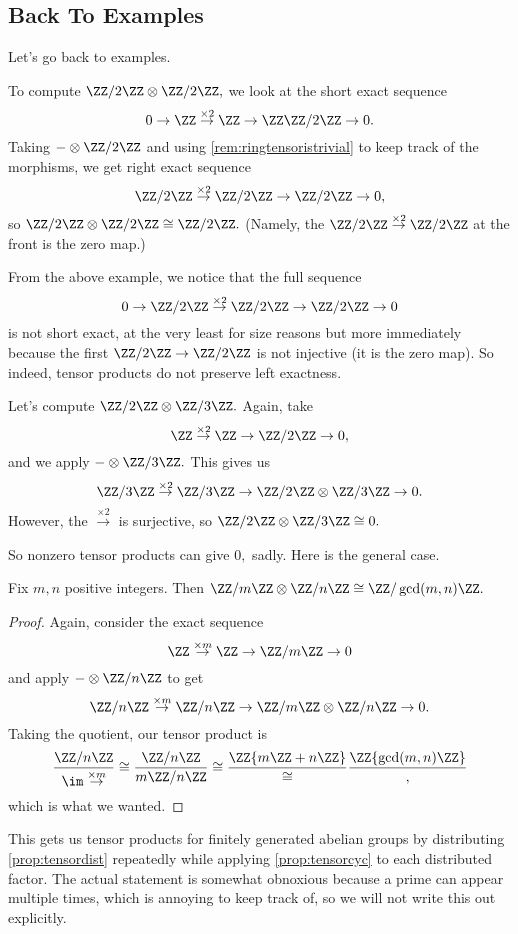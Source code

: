 \subsection{Back To Examples}
Let's go back to examples.
\begin{example}
	To compute $\ZZ/2\ZZ\otimes\ZZ/2\ZZ,$ we look at the short exact sequence
	\[0\to\ZZ\stackrel{\times2}\to\ZZ\to\ZZ\ZZ/2\ZZ\to0.\]
	Taking $-\otimes\ZZ/2\ZZ$ and using \autoref{rem:ringtensoristrivial} to keep track of the morphisms, we get right exact sequence
	\[\ZZ/2\ZZ\stackrel{\times2}\to\ZZ/2\ZZ\to\ZZ/2\ZZ\to0,\]
	so $\ZZ/2\ZZ\otimes\ZZ/2\ZZ\cong\ZZ/2\ZZ.$ (Namely, the $\ZZ/2\ZZ\stackrel{\times2}\to\ZZ/2\ZZ$ at the front is the zero map.)
\end{example}
From the above example, we notice that the full sequence
\[0\to\ZZ/2\ZZ\stackrel{\times2}\to\ZZ/2\ZZ\to\ZZ/2\ZZ\to0\]
is not short exact, at the very least for size reasons but more immediately because the first $\ZZ/2\ZZ\to\ZZ/2\ZZ$ is not injective (it is the zero map). So indeed, tensor products do not preserve left exactness.
\begin{example}
	Let's compute $\ZZ/2\ZZ\otimes\ZZ/3\ZZ.$ Again, take
	\[\ZZ\stackrel{\times2}\to\ZZ\to\ZZ/2\ZZ\to0,\]
	and we apply $-\otimes\ZZ/3\ZZ.$ This gives us
	\[\ZZ/3\ZZ\stackrel{\times2}\to\ZZ/3\ZZ\to\ZZ/2\ZZ\otimes\ZZ/3\ZZ\to0.\]
	However, the $\stackrel{\times2}\to$ is surjective, so $\ZZ/2\ZZ\otimes\ZZ/3\ZZ\cong0.$
\end{example}
So nonzero tensor products can give $0,$ sadly. Here is the general case.
\begin{exercise} \label{prop:tensorcyc}
	Fix $m,n$ positive integers. Then $\ZZ/m\ZZ\otimes\ZZ/n\ZZ\cong\ZZ/\gcd(m,n)\ZZ.$
\end{exercise}
\begin{proof}
	Again, consider the exact sequence
	\[\ZZ\stackrel{\times m}\to\ZZ\to\ZZ/m\ZZ\to0\]
	and apply $-\otimes\ZZ/n\ZZ$ to get
	\[\ZZ/n\ZZ\stackrel{\times m}\to\ZZ/n\ZZ\to\ZZ/m\ZZ\otimes\ZZ/n\ZZ\to0.\]
	Taking the quotient, our tensor product is
	\[\frac{\ZZ/n\ZZ}{\im\stackrel{\times m}\to}\cong\frac{\ZZ/n\ZZ}{m\ZZ/n\ZZ}\cong\frac\ZZ{m\ZZ+n\ZZ}\cong\frac\ZZ{\gcd(m,n)\ZZ},\]
	which is what we wanted.
\end{proof}
This gets us tensor products for finitely generated abelian groups by distributing \autoref{prop:tensordist} repeatedly while applying \autoref{prop:tensorcyc} to each distributed factor. The actual statement is somewhat obnoxious because a prime can appear multiple times, which is annoying to keep track of, so we will not write this out explicitly.

